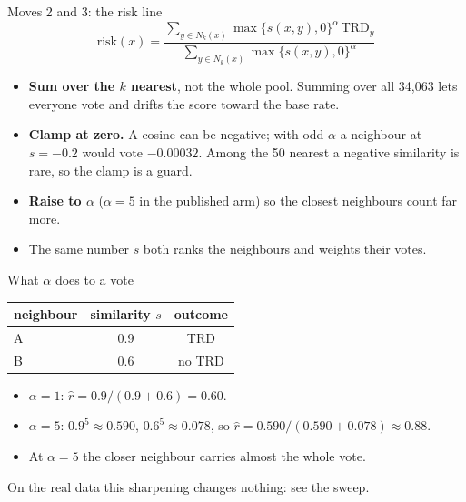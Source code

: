 \documentclass[aspectratio=169]{beamer}
\begin{document}
\begin{frame}{Moves 2 and 3: the risk line}
  \[
    \mathrm{risk}(x) = \frac{\sum_{y\in N_k(x)} \max\{s(x,y),0\}^{\alpha}\,\mathrm{TRD}_y}{\sum_{y\in N_k(x)} \max\{s(x,y),0\}^{\alpha}}
  \]
  \begin{itemize}
    \item \textbf{Sum over the $k$ nearest}, not the whole pool. Summing over all 34{,}063 lets everyone vote and drifts the score toward the base rate.
    \item \textbf{Clamp at zero.} A cosine can be negative; with odd $\alpha$ a neighbour at $s=-0.2$ would vote $-0.00032$. Among the 50 nearest a negative similarity is rare, so the clamp is a guard.
    \item \textbf{Raise to $\alpha$} ($\alpha=5$ in the published arm) so the closest neighbours count far more.
    \item The same number $s$ both ranks the neighbours and weights their votes.
  \end{itemize}
\end{frame}

\begin{frame}{What $\alpha$ does to a vote}
  \begin{center}
  \begin{tabular}{lcc}
    \toprule
    neighbour & similarity $s$ & outcome \\
    \midrule
    A & 0.9 & TRD \\
    B & 0.6 & no TRD \\
    \bottomrule
  \end{tabular}
  \end{center}
  \begin{itemize}
    \item $\alpha=1$: $\hat r = 0.9/(0.9+0.6) = 0.60$.
    \item $\alpha=5$: $0.9^5\approx 0.590$, $0.6^5\approx 0.078$, so $\hat r = 0.590/(0.590+0.078)\approx 0.88$.
    \item At $\alpha=5$ the closer neighbour carries almost the whole vote.
  \end{itemize}
  \vspace{0.5em}
  On the real data this sharpening changes nothing: see the sweep.
\end{frame}
\end{document}
